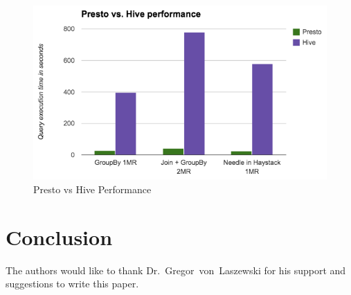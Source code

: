 \begin{figure}[!ht]
  \centering\includegraphics[width=\columnwidth]{image/presto-benchmark.png}
  \caption{Presto vs Hive Performance}\label{f:benchmark}
\end{figure}


\section{Conclusion}



\begin{acks}

  The authors would like to thank Dr.~Gregor~von~Laszewski for his
  support and suggestions to write this paper.

\end{acks}


 


